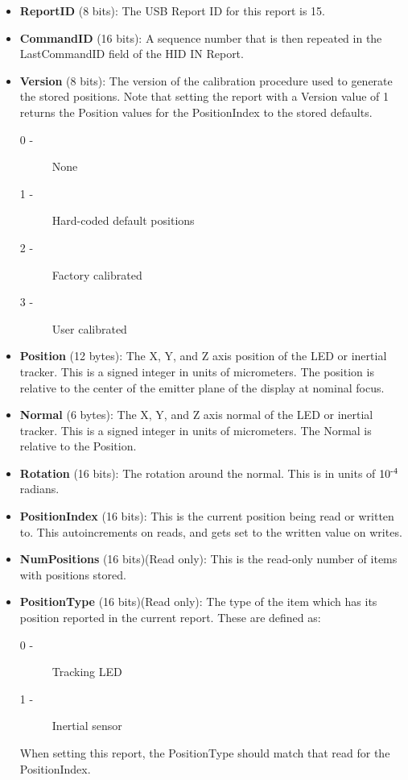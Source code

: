 \documentclass[letterpaper]{article}
\begin{document}
\begin{itemize}
  \item {\bfseries ReportID} (8 bits): The USB Report ID for this report is 15.
  \item {\bfseries CommandID} (16 bits): A sequence number that is then repeated in the LastCommandID field of the HID IN Report.
  \item {\bfseries Version} (8 bits): The version of the calibration procedure used to generate the stored positions.  Note that setting the report with a Version value of 1 returns the Position values for the PositionIndex to the stored defaults.
    \begin{description}
      \item[0 -] None
      \item[1 -] Hard-coded default positions
      \item[2 -] Factory calibrated
      \item[3 -] User calibrated
    \end{description}
  \item {\bfseries Position} (12 bytes): The X, Y, and Z axis position of the LED or inertial tracker.  This is a signed integer in units of micrometers.  The position is relative to the center of the emitter plane of the display at nominal focus.
  \item {\bfseries Normal} (6 bytes): The X, Y, and Z axis normal of the LED or inertial tracker.  This is a signed integer in units of micrometers.  The Normal is relative to the Position.
  \item {\bfseries Rotation} (16 bits): The rotation around the normal.  This is in units of $ 10\textsuperscript{-4}$ radians.
  \item {\bfseries PositionIndex} (16 bits): This is the current position being read or written to.  This autoincrements on reads, and gets set to the written value on writes.
  \item {\bfseries NumPositions} (16 bits)(Read only): This is the read-only number of items with positions stored.
  \item {\bfseries PositionType} (16 bits)(Read only): The type of the item which has its position reported in the current report.  These are defined as:
    \begin{description}
      \item[0 -] Tracking LED
      \item[1 -] Inertial sensor
    \end{description}
    When setting this report, the PositionType should match that read for the PositionIndex.
\end{itemize}
\end{document}

